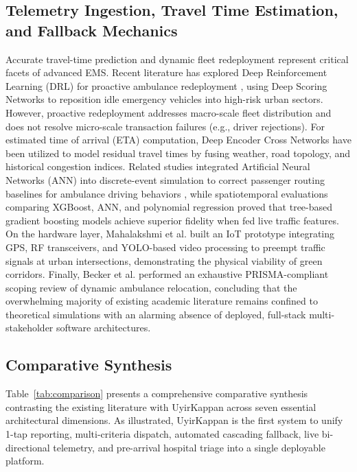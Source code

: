 \documentclass[conference]{IEEEtran}
\begin{document}
\subsection{Telemetry Ingestion, Travel Time Estimation, and Fallback Mechanics}
Accurate travel-time prediction and dynamic fleet redeployment represent critical facets of advanced EMS. Recent literature has explored Deep Reinforcement Learning (DRL) for proactive ambulance redeployment \cite{alhussaini2025dynamic}, using Deep Scoring Networks to reposition idle emergency vehicles into high-risk urban sectors. However, proactive redeployment addresses macro-scale fleet distribution and does not resolve micro-scale transaction failures (e.g., driver rejections). For estimated time of arrival (ETA) computation, Deep Encoder Cross Networks \cite{wang2023deep} have been utilized to model residual travel times by fusing weather, road topology, and historical congestion indices. Related studies integrated Artificial Neural Networks (ANN) into discrete-event simulation to correct passenger routing baselines for ambulance driving behaviors \cite{martinez2024integrating}, while spatiotemporal evaluations comparing XGBoost, ANN, and polynomial regression \cite{senaratne2024ambulance} proved that tree-based gradient boosting models achieve superior fidelity when fed live traffic features. On the hardware layer, Mahalakshmi et al. \cite{mahalakshmi2022adaptive} built an IoT prototype integrating GPS, RF transceivers, and YOLO-based video processing to preempt traffic signals at urban intersections, demonstrating the physical viability of green corridors. Finally, Becker et al. \cite{becker2023dynamic} performed an exhaustive PRISMA-compliant scoping review of dynamic ambulance relocation, concluding that the overwhelming majority of existing academic literature remains confined to theoretical simulations with an alarming absence of deployed, full-stack multi-stakeholder software architectures.

\subsection{Comparative Synthesis}
Table~\ref{tab:comparison} presents a comprehensive comparative synthesis contrasting the existing literature with UyirKappan across seven essential architectural dimensions. As illustrated, UyirKappan is the first system to unify 1-tap reporting, multi-criteria dispatch, automated cascading fallback, live bi-directional telemetry, and pre-arrival hospital triage into a single deployable platform.
\end{document}
